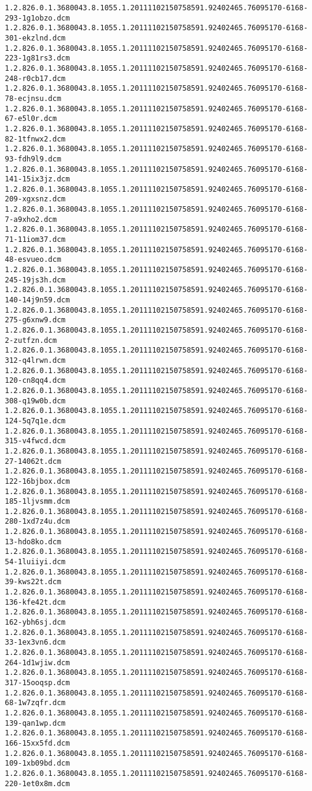 \begin{lstlisting}
1.2.826.0.1.3680043.8.1055.1.20111102150758591.92402465.76095170-6168-293-1g1obzo.dcm 1.2.826.0.1.3680043.8.1055.1.20111102150758591.92402465.76095170-6168-301-ekzlnd.dcm 1.2.826.0.1.3680043.8.1055.1.20111102150758591.92402465.76095170-6168-223-1g81rs3.dcm 1.2.826.0.1.3680043.8.1055.1.20111102150758591.92402465.76095170-6168-248-r0cb17.dcm 1.2.826.0.1.3680043.8.1055.1.20111102150758591.92402465.76095170-6168-78-ecjnsu.dcm 1.2.826.0.1.3680043.8.1055.1.20111102150758591.92402465.76095170-6168-67-e5l0r.dcm 1.2.826.0.1.3680043.8.1055.1.20111102150758591.92402465.76095170-6168-82-1tfnwx2.dcm 1.2.826.0.1.3680043.8.1055.1.20111102150758591.92402465.76095170-6168-93-fdh9l9.dcm 1.2.826.0.1.3680043.8.1055.1.20111102150758591.92402465.76095170-6168-141-15ix3jz.dcm 1.2.826.0.1.3680043.8.1055.1.20111102150758591.92402465.76095170-6168-209-xgxsnz.dcm 1.2.826.0.1.3680043.8.1055.1.20111102150758591.92402465.76095170-6168-7-a9xho2.dcm 1.2.826.0.1.3680043.8.1055.1.20111102150758591.92402465.76095170-6168-71-11iom37.dcm 1.2.826.0.1.3680043.8.1055.1.20111102150758591.92402465.76095170-6168-48-esvueo.dcm 1.2.826.0.1.3680043.8.1055.1.20111102150758591.92402465.76095170-6168-245-19js3h.dcm 1.2.826.0.1.3680043.8.1055.1.20111102150758591.92402465.76095170-6168-140-14j9n59.dcm 1.2.826.0.1.3680043.8.1055.1.20111102150758591.92402465.76095170-6168-275-g6xnw9.dcm 1.2.826.0.1.3680043.8.1055.1.20111102150758591.92402465.76095170-6168-2-zutfzn.dcm 1.2.826.0.1.3680043.8.1055.1.20111102150758591.92402465.76095170-6168-312-q4lrwn.dcm 1.2.826.0.1.3680043.8.1055.1.20111102150758591.92402465.76095170-6168-120-cn8qq4.dcm 1.2.826.0.1.3680043.8.1055.1.20111102150758591.92402465.76095170-6168-308-q19w0b.dcm 1.2.826.0.1.3680043.8.1055.1.20111102150758591.92402465.76095170-6168-124-5q7q1e.dcm 1.2.826.0.1.3680043.8.1055.1.20111102150758591.92402465.76095170-6168-315-v4fwcd.dcm 1.2.826.0.1.3680043.8.1055.1.20111102150758591.92402465.76095170-6168-27-14062t.dcm 1.2.826.0.1.3680043.8.1055.1.20111102150758591.92402465.76095170-6168-122-16bjbox.dcm 1.2.826.0.1.3680043.8.1055.1.20111102150758591.92402465.76095170-6168-185-1ljvsmm.dcm 1.2.826.0.1.3680043.8.1055.1.20111102150758591.92402465.76095170-6168-280-1xd7z4u.dcm 1.2.826.0.1.3680043.8.1055.1.20111102150758591.92402465.76095170-6168-13-hdo8ko.dcm 1.2.826.0.1.3680043.8.1055.1.20111102150758591.92402465.76095170-6168-54-1luiiyi.dcm 1.2.826.0.1.3680043.8.1055.1.20111102150758591.92402465.76095170-6168-39-kws22t.dcm 1.2.826.0.1.3680043.8.1055.1.20111102150758591.92402465.76095170-6168-136-kfe42t.dcm 1.2.826.0.1.3680043.8.1055.1.20111102150758591.92402465.76095170-6168-162-ybh6sj.dcm 1.2.826.0.1.3680043.8.1055.1.20111102150758591.92402465.76095170-6168-33-1ex3vn6.dcm 1.2.826.0.1.3680043.8.1055.1.20111102150758591.92402465.76095170-6168-264-1d1wjiw.dcm 1.2.826.0.1.3680043.8.1055.1.20111102150758591.92402465.76095170-6168-317-15ooqsp.dcm 1.2.826.0.1.3680043.8.1055.1.20111102150758591.92402465.76095170-6168-68-1w7zqfr.dcm 1.2.826.0.1.3680043.8.1055.1.20111102150758591.92402465.76095170-6168-139-qan1wp.dcm 1.2.826.0.1.3680043.8.1055.1.20111102150758591.92402465.76095170-6168-166-15xx5fd.dcm 1.2.826.0.1.3680043.8.1055.1.20111102150758591.92402465.76095170-6168-109-1xb09bd.dcm 1.2.826.0.1.3680043.8.1055.1.20111102150758591.92402465.76095170-6168-220-1et0x8m.dcm 
\end{lstlisting}

